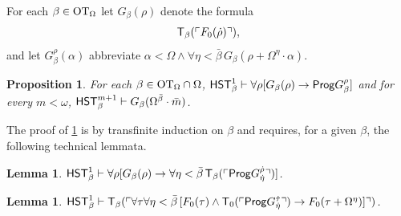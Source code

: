 \documentclass[UKenglish,cleveref,DIV=12]{scrartcl}
\newtheorem{lemma}[theorem]{Lemma}%
\newtheorem{proposition}[lemma]{Proposition}
\theoremstyle{definition}
\theoremstyle{definition}
\begin{document}
For each $\beta\in\mathrm{OT}_\Omega$ let $G_\beta(\rho)$ denote the formula
\begin{align*}
  \mathsf{T}_{\beta}(\ulcorner{F_0(\dot\rho)}\urcorner),
\end{align*}
and let $G_\beta^\rho(\alpha)$ abbreviate $\alpha<\Omega\land \forall\eta<\bar\beta\,G_\beta(\rho+\Omega^\eta\cdot\alpha)$.
\begin{proposition}\label{lem:Fbetawellordering1}
 For each $\beta\in\mathrm{OT}_\Omega\cap\Omega$, $\mathsf{HST}_{\beta}^1\vdash \forall\rho[G_\beta(\rho)\rightarrow \mathsf{Prog} G_\beta^\rho]$ and for every $m<\omega$, $\mathsf{HST}_{\beta}^{m+1}\vdash G_\beta(\Omega^{\bar\beta}\cdot\bar m)$.
\end{proposition}
The proof of \cref{lem:Fbetawellordering1} is by transfinite induction on
$\beta$ and requires, for a given $\beta$, the following technical lemmata.
\begin{lemma}\label{lem:Fbetatech1}
 $\mathsf{HST}_\beta^1\vdash \forall\rho[G_\beta(\rho)\rightarrow \forall\eta<\bar\beta\,\mathsf{T}_\beta(\ulcorner{\mathsf{Prog}G_{\dot\eta}^{\dot\rho}}\urcorner)]$.
\end{lemma}
\begin{lemma}\label{lem:Fbetatech2}
  $\mathsf{HST}_\beta^1\vdash \mathsf{T}_\beta(\ulcorner{\forall\tau\forall\eta<\bar\beta\,[F_0(\tau)\land\mathsf{T}_0(\ulcorner{\mathsf{Prog}G_{\dot\eta}^{\dot\tau}}\urcorner) \rightarrow
  F_0(\tau+\Omega^{\eta})]}\urcorner)$.
\end{lemma}
\end{document}
